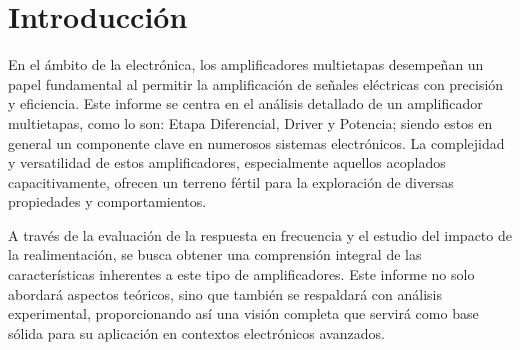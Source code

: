 
\section{Introducción}
En el ámbito de la electrónica, los amplificadores multietapas desempeñan un papel fundamental al permitir la amplificación de señales eléctricas con precisión y eficiencia. Este informe se centra en el análisis detallado de un amplificador multietapas, como lo son: Etapa Diferencial, Driver y Potencia; siendo estos en general un componente clave en numerosos sistemas electrónicos. La complejidad y versatilidad de estos amplificadores, especialmente aquellos acoplados capacitivamente, ofrecen un terreno fértil para la exploración de diversas propiedades y comportamientos.

A través de la evaluación de la respuesta en frecuencia y el estudio del impacto de la realimentación, se busca obtener una comprensión integral de las características inherentes a este tipo de amplificadores. Este informe no solo abordará aspectos teóricos, sino que también se respaldará con análisis experimental, proporcionando así una visión completa que servirá como base sólida para su aplicación en contextos electrónicos avanzados.

\newpage